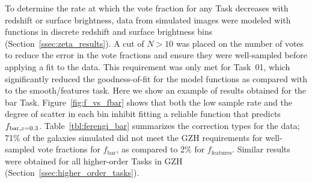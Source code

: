 \documentclass[twocolumn]{aastex6}
\begin{document}
To determine the rate at which the vote fraction for any Task decreases with redshift or surface brightness, data from simulated \ferengi{} images were modeled with functions in discrete redshift and surface brightness bins (Section~\ref{ssec:zeta_results}). A cut of $N>10$ was placed on the number of votes to reduce the error in the vote fractions and ensure they were well-sampled before applying a fit to the data. This requirement was only met for Task~01, which significantly reduced the goodness-of-fit for the model functions as compared with to the smooth/features task. Here we show an example of results obtained for the bar Task. Figure~\ref{fig:f_vs_fbar} shows that both the low sample rate and the degree of scatter in each bin inhibit fitting a reliable function that predicts $f_{{\rm bar},z=0.3}$. Table~\ref{tbl:ferengi_bar} summarizes the correction types for the \ferengi{} data; 71\% of the galaxies simulated did not meet the GZH requirements for well-sampled vote fractions for $f_\mathrm{bar}$, as compared to 2\% for $f_\mathrm{features}$. Similar results were obtained for all higher-order Tasks in GZH (Section~\ref{ssec:higher_order_tasks}).  
\end{document}
